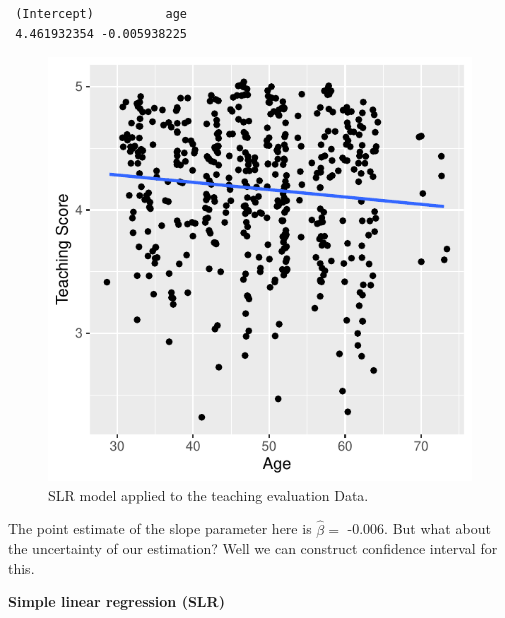 \documentclass[
  letterpaper,
  DIV=11,
  numbers=noendperiod]{scrartcl}
\begin{document}
\begin{verbatim}
 (Intercept)          age 
 4.461932354 -0.005938225 
\end{verbatim}

\begin{figure}[H]

{\centering \includegraphics{notes_files/figure-pdf/unnamed-chunk-18-1.pdf}

}

\caption{SLR model applied to the teaching evaluation Data.}

\end{figure}%

The point estimate of the slope parameter here is \(\widehat{\beta}=\)
-0.006. But what about the uncertainty of our estimation? Well we can
construct confidence interval for this.

\textbf{Simple linear regression (SLR)}
\end{document}
